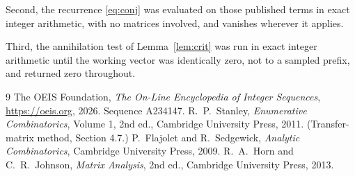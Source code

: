 \documentclass[11pt,a4paper]{article}
\theoremstyle{plain}
\theoremstyle{definition}
\begin{document}
Second, the recurrence \eqref{eq:conj} was evaluated on those published terms in exact
integer arithmetic, with no matrices involved, and vanishes wherever it applies.

Third, the annihilation test of Lemma~\ref{lem:crit} was run in exact integer arithmetic
until the working vector was identically zero, not to a sampled prefix, and returned zero
throughout.

\begin{thebibliography}{9}
 The OEIS Foundation, \emph{The On-Line Encyclopedia of Integer
Sequences}, \url{https://oeis.org}, 2026. Sequence A234147.
 R.~P.~Stanley, \emph{Enumerative Combinatorics}, Volume 1, 2nd ed.,
Cambridge University Press, 2011. (Transfer-matrix method, Section 4.7.)
 P.~Flajolet and R.~Sedgewick, \emph{Analytic Combinatorics}, Cambridge
University Press, 2009.
 R.~A.~Horn and C.~R.~Johnson, \emph{Matrix Analysis}, 2nd ed., Cambridge
University Press, 2013.
\end{thebibliography}
\end{document}
